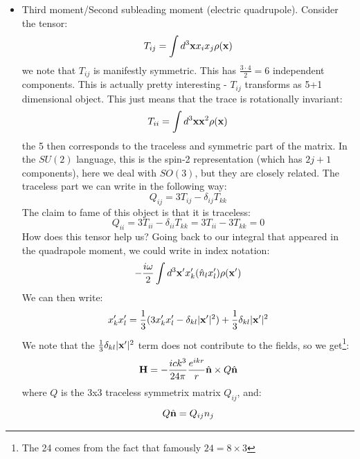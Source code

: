 \begin{itemize}
    \item Third moment/Second subleading moment (electric quadrupole). Consider the tensor:
    \begin{equation}
        T_{ij} = \int d^3\mathbf{x}x_ix_j\rho(\mathbf{x})
    \end{equation}
    we note that $T_{ij}$ is manifestly symmetric. This has $\frac{3 \cdot 4}{2} = 6$ independent components. This is actually pretty interesting - $T_{ij}$ transforms as 5+1 dimensional object. This just means that the trace is rotationally invariant:
    \begin{equation}
        T_{ii} = \int d^3\mathbf{x}\mathbf{x}^2\rho(\mathbf{x})
    \end{equation}
    the 5 then corresponds to the traceless and symmetric part of the matrix. In the $SU(2)$ language, this is the spin-2 representation (which has $2j + 1$ components), here we deal with $SO(3)$, but they are closely related. The traceless part we can write in the following way:
    \begin{equation}
        Q_{ij} = 3T_{ij} - \delta_{ij}T_{kk}
    \end{equation}
    The claim to fame of this object is that it is traceless:
    \begin{equation}
        Q_{ii} = 3T_{ii} - \delta_{ii}T_{kk} = 3T_{ii} - 3T_{kk} = 0
    \end{equation}
    How does this tensor help us? Going back to our integral that appeared in the quadrapole moment, we could write in index notation:
    \begin{equation}
        -\frac{i\omega}{2}\int d^3\mathbf{x}' x_k'(\hat{n}_lx'_l)\rho(\mathbf{x}')
    \end{equation}
    We can then write:
    \begin{equation}
        x_k'x_l' = \frac{1}{3}(3x_k'x_l' - \delta_{kl}\lvert \mathbf{x}' \rvert^2) + \frac{1}{3}\delta_{kl}\lvert \mathbf{x}' \rvert^2
    \end{equation}
    We note that the $\frac{1}{3}\delta_{kl}\lvert \mathbf{x}' \rvert^2$ term does not contribute to the fields, so we get\footnote{The 24 comes from the fact that famously $24 = 8\times3$}:
    \begin{equation}
        \mathbf{H} = -\frac{ick^3}{24\pi}\frac{e^{ikr}}{r}\hat{\mathbf{n}}\times Q\hat{\mathbf{n}}
    \end{equation}
    where $Q$ is the 3x3 traceless symmetrix matrix $Q_{ij}$, and:
    \begin{equation}
        Q\hat{\mathbf{n}} = Q_{ij}n_j
    \end{equation}

\end{itemize}
